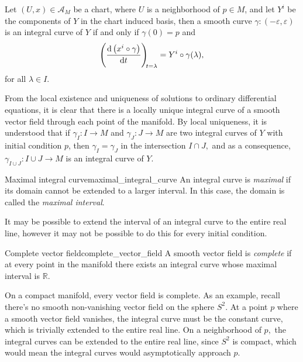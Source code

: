 Let \((U, x) \in \mathscr{A}_M\) be a chart, where \(U\) is a neighborhood of \(p \in M\), and let \(Y^i\) be the components of \(Y\) in the chart induced basis, then a smooth curve \(\gamma : (-\varepsilon, \varepsilon)\) is an integral curve of \(Y\) if and only if \(\gamma(0) = p\) and
\begin{equation*}
    \diff{\left(x^i \circ \gamma\right)}{t}[t=\lambda] = Y^i \circ \gamma (\lambda),
\end{equation*}
for all \(\lambda \in I\).

From the local existence and uniqueness of solutions to ordinary differential equations, it is clear that there is a locally unique integral curve of a smooth vector field through each point of the manifold. By local uniqueness, it is understood that if \(\gamma_I : I \to M\) and \(\gamma_J : J \to M\) are two integral curves of \(Y\) with initial condition \(p\), then \(\gamma_I = \gamma_J\) in the intersection \(I \cap J,\) and as a consequence, \(\gamma_{I \cup J} : I \cup J \to M\) is an integral curve of \(Y\).

\begin{definition}{Maximal integral curve}{maximal_integral_curve}
    An integral curve is \emph{maximal} if its domain cannot be extended to a larger interval. In this case, the domain is called the \emph{maximal interval}.
\end{definition}

It may be possible to extend the interval of an integral curve to the entire real line, however it may not be possible to do this for every initial condition.
\begin{definition}{Complete vector field}{complete_vector_field}
    A smooth vector field is \emph{complete} if at every point in the manifold there exists an integral curve whose maximal interval is \(\mathbb{R}.\)
\end{definition}
\begin{remark}
    On a compact manifold, every vector field is complete. As an example, recall there's no smooth non-vanishing vector field on the sphere \(S^2\). At a point \(p\) where a smooth vector field vanishes, the integral curve must be the constant curve, which is trivially extended to the entire real line. On a neighborhood of \(p,\) the integral curves can be extended to the entire real line, since \(S^2\) is compact, which would mean the integral curves would asymptotically approach \(p\).
\end{remark}

